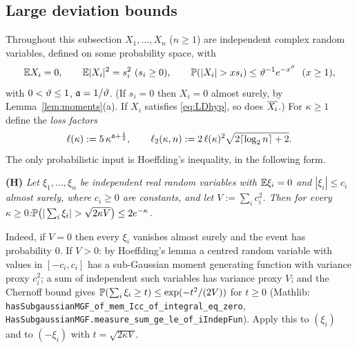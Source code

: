 \subsection{Large deviation bounds}
Throughout this subsection $X_1,\dots,X_n$ ($n\ge1$) are independent complex random variables, defined on some probability space, with
\begin{equation}\label{eq:LDhyp}
 \EE X_i=0,\qquad\EE|X_i|^2=s_i^2\ (s_i\ge0),\qquad\PP(|X_i|>xs_i)\le\vth^{-1}e^{-x^\vth}\ \ (x\ge1),
\end{equation}
with $0<\vartheta\le1$, $\mathfrak{a}=1/\vartheta$. (If $s_i=0$ then $X_i=0$ almost surely, by Lemma~\ref{lem:moments}(a). If $X_i$ satisfies \eqref{eq:LDhyp}, so does $\overline{X_i}$.) For $\kappa\ge1$ define the \emph{loss factors}
\begin{equation}\label{eq:loss}
 \ell(\kappa):=5\,\kappa^{\mathfrak{a}+\frac12},\qquad\ell_2(\kappa,n):=2\,\ell(\kappa)^2\sqrt{2\lceil\log_2n\rceil+2}.
\end{equation}
The only probabilistic input is Hoeffding's inequality, in the following form.

\medskip\noindent\textbf{(H)} \emph{Let $\xi_1,\dots,\xi_n$ be independent real random variables with $\mathbb{E}\xi_i=0$ and $|\xi_i|\le c_i$ almost surely, where $c_i\ge0$ are constants, and let $V:=\sum_ic_i^2$.
Then for every $\kappa\ge0$:\quad $\PP\big(|\sum_i\xi_i|>\sqrt{2\kappa V}\big)\le2e^{-\kappa}$.}

\smallskip\noindent Indeed, if $V=0$ then every $\xi_i$ vanishes almost surely and the event has probability $0$. If $V>0$: by Hoeffding's lemma a centred random variable with values in $[-c_i,c_i]$ has a sub-Gaussian moment generating function with
variance proxy $c_i^2$; a sum of independent such variables has variance proxy $V$; and the Chernoff bound gives $\mathbb{P}(\sum_i\xi_i\ge t)\le\exp(-t^2/(2V))$ for $t\ge0$
(Mathlib: \texttt{hasSubgaussianMGF\_of\_mem\_Icc\_of\_integral\_eq\_zero}, \texttt{HasSubgaussianMGF.measure\_sum\_ge\_le\_of\_iIndepFun}). Apply this to $(\xi_i)$ and to $(-\xi_i)$ with $t=\sqrt{2\kappa V}$.

